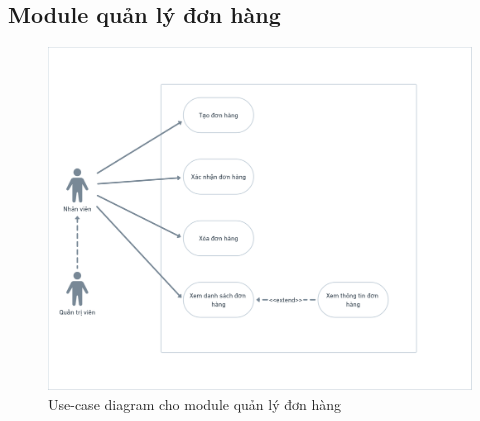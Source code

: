 \subsection{Module quản lý đơn hàng}
\begin{figure}[h]
    \centering
    \includegraphics[scale = 0.2]{img/mod/qldh-mod.png}
    \vspace{1cm}
    \caption{Use-case diagram cho module quản lý đơn hàng}
    \label{fig:taskAssignment}
\end{figure}

